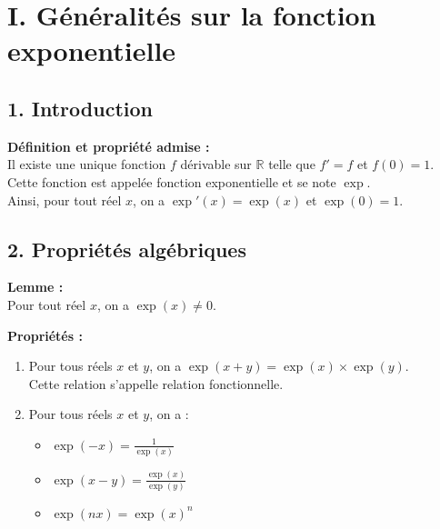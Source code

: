 \documentclass[11pt,a4paper]{article}
\title{\doctitre}
\author{\docniveau \\ \doctheme\text{ - }\doctype}
\date{}
\begin{document}
\maketitle
\pagestyle{custom}
\thispagestyle{custom}

\section*{I. Généralités sur la fonction exponentielle}
\subsection*{1. Introduction}

\begin{mdframed}[style=definitionStyle]
    \textbf{Définition et propriété admise :} ~\\
    Il existe une unique fonction $f$ dérivable sur $\mathbb{R}$ telle que $f'=f$ et $f(0)=1$. \\
    Cette fonction est appelée fonction exponentielle et se note $\exp$. \\
    Ainsi, pour tout réel $x$, on a $\exp'(x)=\exp(x)$ et $\exp(0)=1$.
\end{mdframed}

\subsection*{2. Propriétés algébriques}

\begin{mdframed}[style=proprieteStyle]
    \textbf{Lemme :} ~\\
    Pour tout réel $x$, on a $\exp(x)\not=0$.
\end{mdframed}

\begin{mdframed}[style=proprieteStyle]
    \textbf{Propriétés :}
    \begin{enumerate}
        \item Pour tous réels $x$ et $y$, on a $\exp(x+y)=\exp(x)\times\exp(y)$. \\
        Cette relation s'appelle relation fonctionnelle.
        \item Pour tous réels $x$ et $y$, on a :
        \begin{itemize}
            \item $\displaystyle\exp(-x)=\frac{1}{\exp(x)}$
            \item $\displaystyle\exp(x-y)=\frac{\exp(x)}{\exp(y)}$ 
            \item $\displaystyle\exp(nx)=\exp(x)^n$ 
        \end{itemize}
    \end{enumerate}
\end{mdframed}
\end{document}
